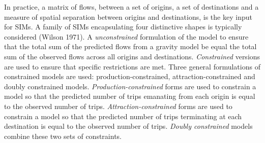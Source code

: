 \documentclass[11pt,letterpaper]{article}
\begin{document}
In practice, a matrix of flows, between a set of origins, a set of destinations and a measure of spatial separation between origins and destinations, is the key input for SIMs.
A family of SIMs encapsulating four distinctive shapes is typically considered (Wilson 1971).
A \emph{unconstrained} formulation of the model to ensure that the total sum of the predicted flows from a gravity model be equal the total sum of the observed flows across all origins and destinations.
\emph{Constrained} versions are used to ensure that specific restrictions are met.
Three general formulations of constrained models are used: production-constrained, attraction-constrained and doubly constrained models.
\emph{Production-constrained} forms are used to constrain a model so that the predicted number of trips emanating from each origin is equal to the observed number of trips.
\emph{Attraction-constrained} forms are used to constrain a model so that the predicted number of trips terminating at each destination is equal to the observed number of trips.
\emph{Doubly constrained} models combine these two sets of constraints.
\end{document}
